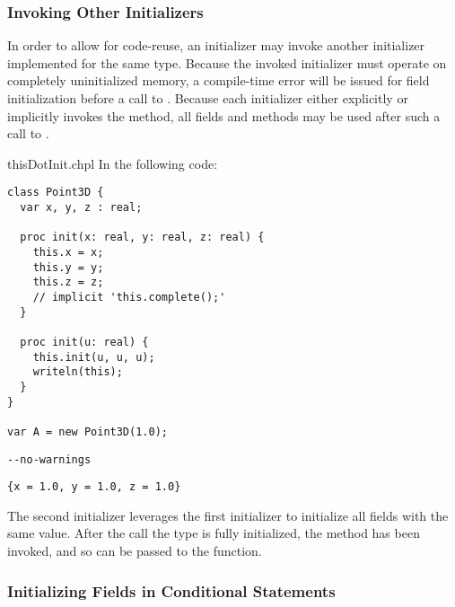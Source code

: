 \subsubsection{Invoking Other Initializers}
\label{Invoking_Other_Initializers}

In order to allow for code-reuse, an initializer may invoke another initializer
implemented for the same type. Because the invoked initializer must operate on
completely uninitialized memory, a compile-time error will be issued for field
initialization before a call to . Because each initializer
either explicitly or implicitly invokes the  method, all fields
and methods may be used after such a call to .

\begin{chapelexample}{thisDotInit.chpl}
In the following code:
\begin{chapel}
\begin{verbatim}
class Point3D {
  var x, y, z : real;

  proc init(x: real, y: real, z: real) {
    this.x = x;
    this.y = y;
    this.z = z;
    // implicit 'this.complete();'
  }

  proc init(u: real) {
    this.init(u, u, u);
    writeln(this);
  }
}

var A = new Point3D(1.0);
\end{verbatim}
\end{chapel}
\begin{chapelcompopts}
\begin{verbatim}
--no-warnings
\end{verbatim}
\end{chapelcompopts}
\begin{chapeloutput}
\begin{verbatim}
{x = 1.0, y = 1.0, z = 1.0}
\end{verbatim}
\end{chapeloutput}
The second initializer leverages the first initializer to initialize all fields
with the same value. After the  call the type is fully initialized,
the  method has been invoked, and so  can be passed
to the  function.
\end{chapelexample}

\subsubsection{Initializing Fields in Conditional Statements}
\label{Initializing_Fields_in_Conditional_Statements}

